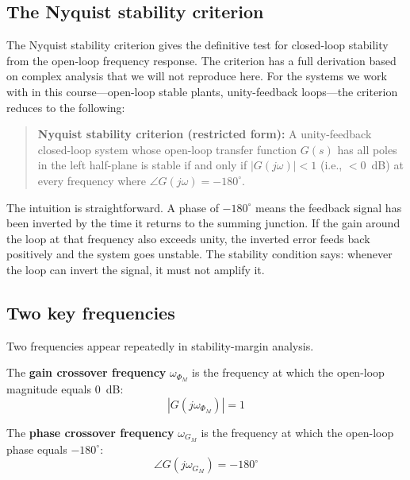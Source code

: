 \documentclass[12pt]{article}
\begin{document}
\subsection{The Nyquist stability criterion}
\label{sec:nyquist}

The Nyquist stability criterion gives the definitive test for closed-loop
stability from the open-loop frequency response.  The criterion has a full
derivation based on complex analysis that we will not reproduce here.  For the
systems we work with in this course---open-loop stable plants, unity-feedback
loops---the criterion reduces to the following:

\begin{quote}
\textbf{Nyquist stability criterion (restricted form):} A unity-feedback
closed-loop system whose open-loop transfer function $G(s)$ has all poles in
the left half-plane is stable if and only if
$|G(j\omega)| < 1$ (i.e., $< 0$~dB) at every frequency where
$\angle G(j\omega) = -180^\circ$.
\end{quote}

The intuition is straightforward.  A phase of $-180^\circ$ means the feedback
signal has been inverted by the time it returns to the summing junction.  If
the gain around the loop at that frequency also exceeds unity, the inverted
error feeds back positively and the system goes unstable.  The stability
condition says: whenever the loop can invert the signal, it must not amplify
it.

\subsection{Two key frequencies}
\label{sec:crossover_freqs}

Two frequencies appear repeatedly in stability-margin analysis.

The \textbf{gain crossover frequency} $\omega_{\Phi_M}$ is the frequency at
which the open-loop magnitude equals 0~dB:
\begin{equation}
  |G(j\omega_{\Phi_M})| = 1
  \label{eq:gc_freq}
\end{equation}

The \textbf{phase crossover frequency} $\omega_{G_M}$ is the frequency at
which the open-loop phase equals $-180^\circ$:
\begin{equation}
  \angle G(j\omega_{G_M}) = -180^\circ
  \label{eq:pc_freq}
\end{equation}
\end{document}
